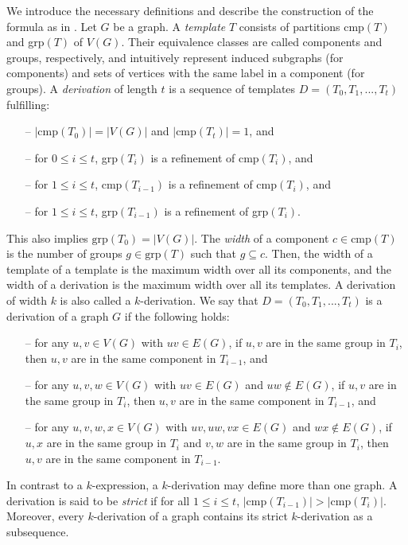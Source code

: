 We introduce the necessary definitions and describe the construction of the formula as in \cite{DBLP:journals/tocl/HeuleS15}.
Let $G$ be a graph.
A {\em template} $T$ consists of partitions cmp$(T)$ and grp$(T)$ of $V(G)$.
Their equivalence classes are called components and groups, respectively, and intuitively represent induced subgraphs (for components) and sets of vertices with the same label in a component (for groups).
A {\em derivation} of length $t$ is a sequence of templates $D = (T_0, T_1, ..., T_t)$ fulfilling:
\begin{enumerate}
	\item[--] $|\text{cmp}(T_0)| = |V(G)|$ and $|\text{cmp}(T_t)|=1$, and
	\item[--] for $0 \leq i \leq t$, grp$(T_i)$ is a refinement of cmp$(T_i)$, and
	\item[--] for $1 \leq i \leq t$, cmp$(T_{i-1})$ is a refinement of cmp$(T_{i})$, and
	\item[--] for $1 \leq i \leq t$, grp$(T_{i-1})$ is a refinement of grp$(T_{i})$.
\end{enumerate}
This also implies $\text{grp}(T_0)=|V(G)|$.
The {\em width} of a component $c \in \text{cmp}(T)$ is the number of groups $g \in \text{grp}(T)$ such that $g \subseteq c$.
Then, the width of a template of a template is the maximum width over all its components, and the width of a derivation is the maximum width over all its templates.
A derivation of width $k$ is also called a $k$-derivation.
We say that $D=(T_0,T_1,...,T_t)$ is a derivation of a graph $G$ if the following holds:
\begin{enumerate}
	\item[--] for any $u,v \in V(G)$ with $uv\in E(G)$, if $u,v$ are in the same group in $T_i$, then $u,v$ are in the same component in $T_{i-1}$, and
	\item[--] for any $u,v,w \in V(G)$ with $uv \in E(G)$ and $uw \not\in E(G)$, if $u,v$ are in the same group in $T_i$, then $u,v$ are in the same component in $T_{i-1}$, and
	\item[--] for any $u,v,w,x \in V(G)$ with $uv,uw,vx \in E(G)$ and $wx \not\in E(G)$, if $u,x$ are in the same group in $T_i$ and $v,w$ are in the same group in $T_i$, then $u,v$ are in the same component in $T_{i-1}$.
\end{enumerate}
In contrast to a $k$-expression, a $k$-derivation may define more than one graph.
A derivation is said to be {\em strict} if for all $1 \leq i \leq t$, $|\text{cmp}(T_{i-1})| > |\text{cmp}(T_i)|$.
Moreover, every $k$-derivation of a graph contains its strict $k$-derivation as a subsequence.

